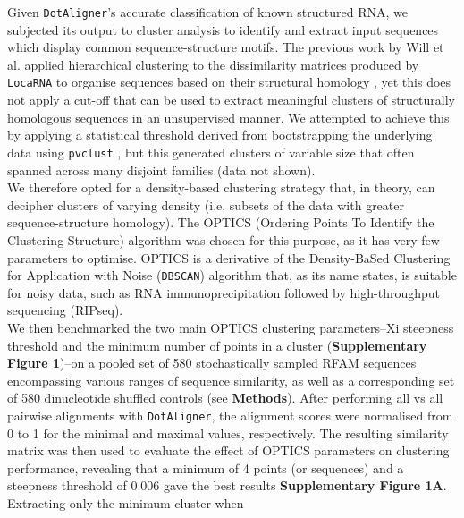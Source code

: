 \documentclass{bmcart}
\newcommand\dotaligner{\texttt{DotAligner}}
\newcommand\locarna{\texttt{LocaRNA}}
\begin{document}
Given \dotaligner{}'s accurate classification of known structured RNA, we subjected its
output to cluster analysis to identify and extract input sequences which display common
sequence-structure motifs. The previous work by Will et al. applied hierarchical clustering 
to the dissimilarity matrices produced by \locarna{} to organise sequences based on their
structural homology \cite{Will17432929}, yet this does not apply a cut-off that can be used 
to extract meaningful clusters of structurally homologous sequences in an unsupervised 
manner. We attempted to achieve this by applying a statistical threshold derived from 
bootstrapping the underlying data using \texttt{pvclust} \cite{suzuki2006pvclust}, but this
generated clusters of variable size that often spanned across many disjoint families 
(data not shown).\\

We therefore opted for a density-based clustering strategy that, in theory, can decipher 
clusters of varying density (i.e. subsets of the data with greater sequence-structure homology). 
The OPTICS (Ordering Points To Identify the Clustering Structure) algorithm \cite{ankerst99ordering}
was chosen for this purpose, as it has very few parameters to optimise. 
OPTICS is a derivative of the Density-BaSed Clustering for Application with Noise
 (\texttt{DBSCAN}) \cite{ester1996density} algorithm that, as its name states, is suitable 
 for noisy data, such as RNA immunoprecipitation followed by high-throughput sequencing 
 (RIPseq).\\

We then benchmarked the two main OPTICS clustering parameters--Xi steepness threshold 
and the minimum number of points in a cluster (\textbf{Supplementary Figure 1})--on a pooled set of 580 
stochastically sampled RFAM sequences encompassing various ranges of sequence similarity, 
as well as a corresponding set of 580 dinucleotide shuffled controls (see \textbf{Methods}). 
After performing all vs all pairwise alignments with \dotaligner{}, 
the alignment scores were normalised from 0 to 1 for the minimal and maximal values, respectively. 
The resulting similarity matrix was then used to evaluate the effect of OPTICS parameters on clustering performance, revealing that a minimum of 4 points (or sequences) and a steepness threshold of 0.006 
gave the best results \textbf{Supplementary Figure 1A}. 
Extracting only the minimum cluster when 
\\
\end{document}
